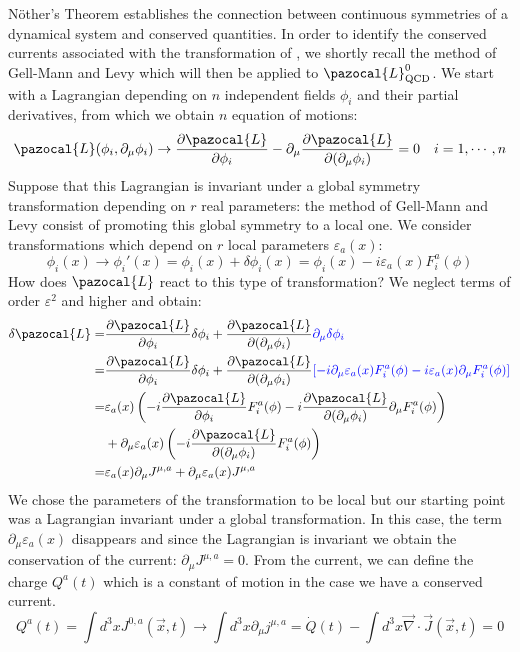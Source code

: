 \documentclass[../main.tex]{subfiles}
\begin{document}
\begin{kaobox}[frametitle=N\"other's Theorem]
N\"other's Theorem establishes the connection between continuous symmetries of a dynamical system and conserved quantities. In order to identify the conserved currents associated with the transformation of , we shortly recall the method of Gell-Mann and Levy which will then be applied to $\pazocal{L}_{\text{QCD}}^0$. We start with a Lagrangian depending on $n$ independent fields $\phi_i$ and their partial derivatives, from which we obtain $n$ equation of motions:
\[
\pazocal{L}(\phi_i,\partial_\mu\phi_i)\to\frac{\partial\pazocal{L}}{\partial\phi_i}-\partial_\mu\frac{\partial\pazocal{L}}{\partial(\partial_\mu\phi_i)}=0 \quad i=1,\cdots,n
\]
Suppose that this Lagrangian is invariant under a global symmetry transformation depending on $r$ real parameters: the method of Gell-Mann and Levy consist of promoting this global symmetry to a local one. We consider transformations which depend on $r$ local parameters $\varepsilon_a(x)$:
\[
\phi_i(x)\to\phi_i'(x)=\phi_i(x)+\delta\phi_i(x)=\phi_i(x)-i\varepsilon_a(x)F_i^a(\phi)
\]
How does $\pazocal{L}$ react to this type of transformation? We neglect terms of order $\varepsilon^2$ and higher and obtain:
\begin{align*}
\delta\pazocal{L}=&\frac{\partial\pazocal{L}}{\partial\phi_i}\delta\phi_i+\frac{\partial\pazocal{L}}{\partial(\partial_\mu\phi_i)}{\color{blue}\partial_\mu\delta\phi_i}\\
=&\frac{\partial\pazocal{L}}{\partial\phi_i}\delta\phi_i+\frac{\partial\pazocal{L}}{\partial(\partial_\mu\phi_i)}{\color{blue}[-i\partial_\mu\varepsilon_a(x)F_i^a(\phi)-i\varepsilon_a(x)\partial_\mu F_i^a(\phi)]}\\
=&\varepsilon_a(x)\left(-i\frac{\partial\pazocal{L}}{\partial\phi_i}F_i^a(\phi)-i\frac{\partial\pazocal{L}}{\partial(\partial_\mu\phi_i)}\partial_\mu F_i^a(\phi)\right)\\
&+\partial_\mu\varepsilon_a(x)\left(-i\frac{\partial\pazocal{L}}{\partial(\partial_\mu\phi_i)}F_i^a(\phi)\right)\\
=&\varepsilon_a(x)\partial_\mu J^{\mu,a}+\partial_\mu\varepsilon_a(x)J^{\mu,a}
\end{align*}
We chose the parameters of the transformation to be local but our starting point was a Lagrangian invariant under a global transformation. In this case, the term $\partial_\mu\varepsilon_a(x)$ disappears and since the Lagrangian is invariant we obtain the conservation of the current: $\partial_\mu J^{\mu,a}=0$. From the current, we can define the charge $Q^a(t)$ which is a constant of motion in the case we have a conserved current.
\[
Q^a(t)=\int d^3xJ^{0,a}(\Vec{x},t)\to\int d^3x\partial_\mu j^{\mu,a}=\Dot{Q}(t)-\int d^3x\Vec{\nabla}\cdot\Vec{J}(\Vec{x},t)=0
\]
\end{kaobox}
\end{document}
